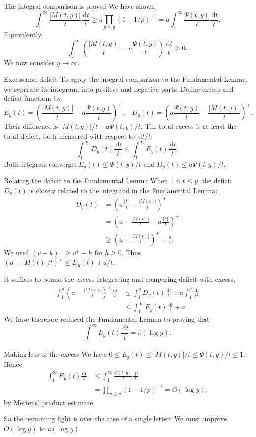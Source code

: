 \documentclass[aspectratio=169,11pt]{beamer}
\newcommand{\dd}{\,\mathrm d}
\begin{document}
\begin{frame}{The integral comparison is proved}
We have shown
\[\int_1^\infty\frac{|M(t,y)|}t\frac{\dd t}t
\ge a\prod_{p\le y}(1-1/p)^{-1}
=a\int_1^\infty\frac{\Psi(t,y)}t\frac{\dd t}t.\]
Equivalently,
\[\int_1^\infty\left(\frac{|M(t,y)|}t-a\frac{\Psi(t,y)}t\right)\frac{\dd t}t\ge0.\]
We now consider $y\to\infty$.
\end{frame}
\begin{frame}{Excess and deficit}
To apply the integral comparison to the Fundamental Lemma, we separate its integrand into positive and negative parts. Define excess and deficit functions by
\[E_y(t)=\left(\frac{|M(t,y)|}t-a\frac{\Psi(t,y)}t\right)^+,\quad
D_y(t)=\left(a\frac{\Psi(t,y)}t-\frac{|M(t,y)|}t\right)^+.\]
Their difference is $|M(t,y)|/t-a\Psi(t,y)/t$. The total excess is at least the total deficit, both measured with respect to $\dd t/t$:
\[\int_1^\infty D_y(t)\frac{\dd t}t\le\int_1^\infty E_y(t)\frac{\dd t}t.\]
Both integrals converge: $E_y(t)\le\Psi(t,y)/t$ and $D_y(t)\le a\Psi(t,y)/t$.
\end{frame}
\begin{frame}{Relating the deficit to the Fundamental Lemma}
When $1\le t\le y$, the deficit $D_y(t)$ is closely related to the integrand in the Fundamental Lemma:
\begin{align*}
D_y(t)&=\left(a\frac{\lfloor t\rfloor}t-\frac{|M(t)|}t\right)^+\\
&=\left(a-\frac{|M(t)|}t-a\frac{\{t\}}t\right)^+\\
&\ge\left(a-\frac{|M(t)|}t\right)^+-\frac at.
\end{align*}
We used $(v-h)^+\ge v^+-h$ for $h\ge0$. Thus $(a-|M(t)|/t)^+\le D_y(t)+a/t$.
\end{frame}
\begin{frame}{It suffices to bound the excess}
Integrating and comparing deficit with excess,
\begin{align*}
\int_1^y\left(a-\frac{|M(t)|}t\right)^+\frac{\dd t}t
&\le\int_1^y D_y(t)\frac{\dd t}t+a\int_1^y\frac{\dd t}{t^2}\\
&\le\int_1^\infty E_y(t)\frac{\dd t}t+a.
\end{align*}
We have therefore reduced the Fundamental Lemma to proving that
\[\int_1^\infty E_y(t)\frac{\dd t}t=o(\log y).\]
\end{frame}
\begin{frame}{Making less of the excess}
We have $0\le E_y(t)\le|M(t,y)|/t\le\Psi(t,y)/t\le1$. Hence
\begin{align*}
\int_1^\infty E_y(t)\frac{\dd t}t
&\le\int_1^\infty\frac{\Psi(t,y)}t\frac{\dd t}t\\
&=\prod_{p\le y}(1-1/p)^{-1}=O(\log y),
\end{align*}
by Mertens' product estimate.

So the remaining fight is over the case of a single letter: We must improve $O(\log y)$ to $o(\log y)$.
\end{frame}
\end{document}
